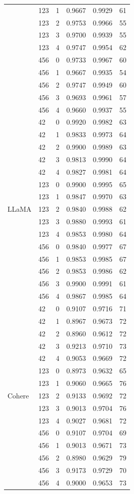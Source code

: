 \documentclass[11pt]{article}
\begin{document}
\begin{table}[!htbp]
\begin{minipage}[t]{0.48\textwidth}
\begin{tabular}{llrrrr}
 & 123 & 1 & 0.9667 & 0.9929 & 61 \\
 & 123 & 2 & 0.9753 & 0.9966 & 55 \\
 & 123 & 3 & 0.9700 & 0.9939 & 55 \\
 & 123 & 4 & 0.9747 & 0.9954 & 62 \\
 & 456 & 0 & 0.9733 & 0.9967 & 60 \\
 & 456 & 1 & 0.9667 & 0.9935 & 54 \\
 & 456 & 2 & 0.9747 & 0.9949 & 60 \\
 & 456 & 3 & 0.9693 & 0.9961 & 57 \\
 & 456 & 4 & 0.9660 & 0.9937 & 55 \\
\midrule
\multirow{15}{*}{LLaMA}
 & 42  & 0 & 0.9920 & 0.9982 & 63 \\
 & 42  & 1 & 0.9833 & 0.9973 & 64 \\
 & 42  & 2 & 0.9900 & 0.9989 & 63 \\
 & 42  & 3 & 0.9813 & 0.9990 & 64 \\
 & 42  & 4 & 0.9827 & 0.9981 & 64 \\
 & 123 & 0 & 0.9900 & 0.9995 & 65 \\
 & 123 & 1 & 0.9847 & 0.9970 & 63 \\
 & 123 & 2 & 0.9840 & 0.9988 & 62 \\
 & 123 & 3 & 0.9880 & 0.9993 & 61 \\
 & 123 & 4 & 0.9853 & 0.9980 & 64 \\
 & 456 & 0 & 0.9840 & 0.9977 & 67 \\
 & 456 & 1 & 0.9853 & 0.9985 & 67 \\
 & 456 & 2 & 0.9853 & 0.9986 & 62 \\
 & 456 & 3 & 0.9900 & 0.9991 & 61 \\
 & 456 & 4 & 0.9867 & 0.9985 & 64 \\
\midrule
\multirow{15}{*}{Cohere}
 & 42  & 0 & 0.9107 & 0.9716 & 71 \\
 & 42  & 1 & 0.8967 & 0.9673 & 72 \\
 & 42  & 2 & 0.8960 & 0.9612 & 72 \\
 & 42  & 3 & 0.9213 & 0.9710 & 73 \\
 & 42  & 4 & 0.9053 & 0.9669 & 72 \\
 & 123 & 0 & 0.8973 & 0.9632 & 65 \\
 & 123 & 1 & 0.9060 & 0.9665 & 76 \\
 & 123 & 2 & 0.9133 & 0.9692 & 72 \\
 & 123 & 3 & 0.9013 & 0.9704 & 76 \\
 & 123 & 4 & 0.9027 & 0.9681 & 72 \\
 & 456 & 0 & 0.9107 & 0.9704 & 69 \\
 & 456 & 1 & 0.9013 & 0.9671 & 73 \\
 & 456 & 2 & 0.8980 & 0.9629 & 79 \\
 & 456 & 3 & 0.9173 & 0.9729 & 70 \\
 & 456 & 4 & 0.9000 & 0.9653 & 73 \\
\bottomrule
\end{tabular}
\end{minipage}
\end{table}
\end{document}
